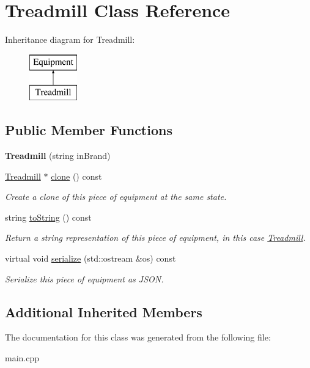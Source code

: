 \hypertarget{class_treadmill}{}\section{Treadmill Class Reference}
\label{class_treadmill}
Inheritance diagram for Treadmill\+:\begin{figure}[H]
\begin{center}
\leavevmode
\includegraphics[height=2.000000cm]{class_treadmill}
\end{center}
\end{figure}
\subsection*{Public Member Functions}
\begin{DoxyCompactItemize}
\item 
\hypertarget{class_treadmill_a0ee14af654d7c248aaadc0f3f68376c7}{}{\bfseries Treadmill} (string in\+Brand)\label{class_treadmill_a0ee14af654d7c248aaadc0f3f68376c7}

\item 
\hypertarget{class_treadmill_a3104f532767a01da7e48a9935242a032}{}\hyperlink{class_treadmill}{Treadmill} $\ast$ \hyperlink{class_treadmill_a3104f532767a01da7e48a9935242a032}{clone} () const \label{class_treadmill_a3104f532767a01da7e48a9935242a032}

\begin{DoxyCompactList}\small\item\em Create a clone of this piece of equipment at the same state. \end{DoxyCompactList}\item 
\hypertarget{class_treadmill_a695c6c44899532cb3505833f4d6dd031}{}string \hyperlink{class_treadmill_a695c6c44899532cb3505833f4d6dd031}{to\+String} () const \label{class_treadmill_a695c6c44899532cb3505833f4d6dd031}

\begin{DoxyCompactList}\small\item\em Return a string representation of this piece of equipment, in this case \textquotesingle{}\hyperlink{class_treadmill}{Treadmill}\textquotesingle{}. \end{DoxyCompactList}\item 
\hypertarget{class_treadmill_a3317a5d36f9344fc2cbfa229fd9a5ace}{}virtual void \hyperlink{class_treadmill_a3317a5d36f9344fc2cbfa229fd9a5ace}{serialize} (std\+::ostream \&os) const \label{class_treadmill_a3317a5d36f9344fc2cbfa229fd9a5ace}

\begin{DoxyCompactList}\small\item\em Serialize this piece of equipment as J\+S\+O\+N. \end{DoxyCompactList}\end{DoxyCompactItemize}
\subsection*{Additional Inherited Members}


The documentation for this class was generated from the following file\+:\begin{DoxyCompactItemize}
\item 
main.\+cpp\end{DoxyCompactItemize}
